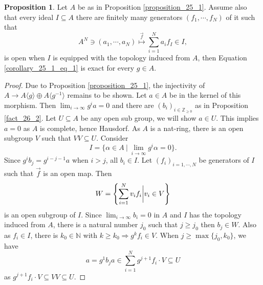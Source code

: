 \documentclass[10pt]{article}
\numberwithin{equation}{section}
\theoremstyle{definition}
\newtheorem{proposition}{Proposition}[subsection]
\newcommand{\N}[0]{\mathbb{N}}
\newcommand{\Z}[0]{\mathbb{Z}}
\newcommand{\sep}[0]{\:|\:}
\begin{document}
\begin{proposition}
    \label{proposition_26_2}
    Let $A$ be as in Proposition \ref{proposition_25_1}. Assume also that every ideal $I\subseteq A$ there are finitely many generators $(f_1,\cdots,f_N)$ of it such that 
    \begin{equation*}
        A^N\ni(a_1,\cdots,a_N)\stackrel{\vec{f}}{\mapsto}\sum_{i=1}^N a_if_I\in I,
    \end{equation*}
    is open when $I$ is equipped with the topology induced from $A$, then Equation \eqref{corollary_25_1_eq_1} is exact for every $g\in A$.
\end{proposition}
\begin{proof}
Due to Proposition \ref{proposition_25_1}, the injectivity of $A\to A\langle g\rangle\oplus A\langle g^{-1}\rangle$ remains to be shown. Let $a\in A$ be in the kernel of this morphism. Then $\lim_{i\to \infty}g^ia=0$ and there are $(b_i)_{i\in\Z_{\geq0}}$ as in Proposition \ref{fact_26_2}. Let $U\subseteq A$ be any open sub group, we will show $a\in U$. 
This implies $a=0$ as $A$ is complete, hence Hausdorf. As $A$ is a nat-ring, there is an open subgroup $V$ such that $VV\subseteq U$. 
Consider 
\begin{equation*}
    I = \{\alpha\in A\sep \lim_{i\to\infty}g^i\alpha = 0\}.
\end{equation*}
Since $g^ib_j = g^{i-j-1}a$ when $i>j$, all $b_i\in I$. Let $(f_i)_{i=1,\cdots,N}$ be generators of $I$ such that $\vec{f}$ is an open map. Then 
\begin{equation*}
    W = \left\{\sum_{i=1}^Nv_if_i\bigg{\vert}v_i\in V\right\}
\end{equation*}
is an open subgroup of $I$. Since $\lim_{i\to\infty}b_i=0$ in $A$ and $I$ has the topology induced from $A$, there is a natural number $j_0$ such that $j\geq j_0$ then $b_j\in W$. Also as $f_i\in I$, there is $k_0\in\N$ with $k\geq k_0\Rightarrow g^kf_i\in V$. 
When $j\geq\max\{j_0,k_0\}$, we have 
\begin{equation*}
    a = g^{1}b_ja \in \sum_{i=1}^N g^{j+1}f_i\cdot V\subseteq U
\end{equation*}
as $g^{j+1}f_i\cdot V\subseteq VV\subseteq U$.
\end{proof}
\end{document}
